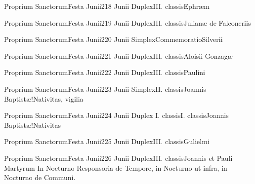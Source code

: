 \documentclass[liber-responsorialis_sanctorale.tex]{subfiles}
\begin{document}
	{Proprium Sanctorum}{Festa Junii}{2}{18 Junii}
	{Duplex}{III. classis}{Ephræm}
	{\conpdorubric}
	{\respdetemp}

	{Proprium Sanctorum}{Festa Junii}{2}{19 Junii}
	{Duplex}{III. classis}{Julianæ de Falconeriis}
	{\vnrubric}
	{\respdetemp}

	{Proprium Sanctorum}{Festa Junii}{2}{20 Junii}
	{Simplex}{Commemoratio}{Silverii}
	{}
	{}
\rubric{\respdetemp}

	{Proprium Sanctorum}{Festa Junii}{2}{21 Junii}
	{Duplex}{III. classis}{Aloisii Gonzagæ}
	{\conprubric}
	{\respdetemp}

	{Proprium Sanctorum}{Festa Junii}{2}{22 Junii}
	{Duplex}{III. classis}{Paulini}
	{\coporubric}
	{\respdetemp}

	{Proprium Sanctorum}{Festa Junii}{2}{23 Junii}
	{Simplex}{II. classis}{Joannis Baptistæ!Nativitas, vigilia}
	{}
	{}
\rubric{\respdetemp}

	{Proprium Sanctorum}{Festa Junii}{2}{24 Junii}
	{Duplex I. classis}{I. classis}{Joannis Baptistæ!Nativitas}
	{}
	{}


	{Proprium Sanctorum}{Festa Junii}{2}{25 Junii}
	{Duplex}{III. classis}{Gulielmi}
	{\conprubric}
	{\respdetemp}

	{Proprium Sanctorum}{Festa Junii}{2}{26 Junii}
	{Duplex}{III. classis}{Joannis et Pauli Martyrum}
	{In  Nocturno Responsoria de Tempore, in  Nocturno ut infra, in  Nocturno de Communi.}
	{\respdetemp}
\end{document}
